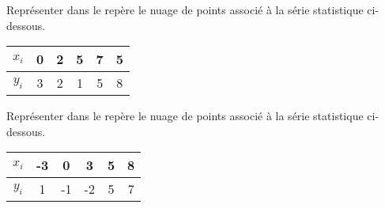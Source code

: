 \documentclass[11pt]{article}
\begin{document}
\begin{multicols}{2}

\begin{exercice}
Représenter dans le repère le nuage de points associé à la série
statistique ci-dessous.

\begin{center}
\begin{tabular}{|c|c|c|c|c|c|}
\hline
$x_i$ & 0 & 2 & 5 & 7 & 5  \\
\hline
$y_i$ & 3 & 2 & 1 & 5 & 8 \\
\hline
\end{tabular}
\end{center}

\begin{center}
\end{center}
\end{exercice}

\begin{exercice}
Représenter dans le repère le nuage de points associé à la série
statistique ci-dessous.

\begin{center}
\begin{tabular}{|c|c|c|c|c|c|}
\hline
$x_i$ & -3 & 0 & 3 & 5 & 8 \\
\hline
$y_i$ & 1 & -1 & -2 & 5 & 7 \\
\hline
\end{tabular}
\end{center}

\begin{center}
\end{center}
\end{exercice}

\end{multicols}
\end{document}
